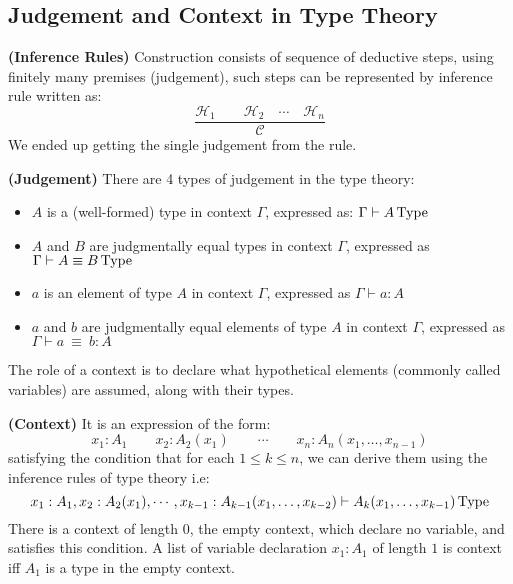 \subsection{Judgement and Context in Type Theory}

\begin{definition}{\textbf{(Inference Rules)}}
    Construction consists of sequence of deductive steps, using finitely many premises (judgement), such steps can be represented by inference rule written as:
    \begin{equation*}
        \frac{\mathcal{H}_1\qquad\mathcal{H}_2\quad\cdots\quad\mathcal{H}_n}{\mathcal{C}}
    \end{equation*}
    We ended up getting the single judgement from the rule.
\end{definition}

\begin{definition}{\textbf{(Judgement)}}
    There are 4 types of judgement in the type theory:
    \begin{itemize}
        \item $A$ is a (well-formed) type in context $\Gamma$, expressed as: $\Gamma\vdash A \operatorname{Type} $
        \item $A$ and $B$ are judgmentally equal types in context $\Gamma$, expressed as $\Gamma\vdash A\equiv B\operatorname{Type} $
        \item $a$ is an element of type $A$ in context $\Gamma$, expressed as $\Gamma\vdash a:A$
        \item $a$ and $b$ are judgmentally equal elements of type $A$ in context $\Gamma$, expressed as $\Gamma\vdash a \ \equiv \ b:A$
    \end{itemize}

\end{definition}

The role of a context is to declare what hypothetical elements (commonly called variables) are assumed, along with their types.

\begin{definition}{\textbf{(Context)}}
    It is an expression of the form:
    \begin{equation*}
        x_1:A_1 \qquad x_2:A_2(x_1) \qquad \cdots \qquad x_n:A_n(x_1,\dots,x_{n-1})
    \end{equation*}
    satisfying the condition that for each $1\le k\le n$, we can derive them using the inference rules of type theory i.e:
    \begin{equation*}
        x_1:A_1, x_2:A_2(x_1) , \cdots, x_{k-1}:A_{k-1}(x_1, \dots, x_{k-2})\vdash A_k(x_1,\dots,x_{k-1}) \operatorname{Type} 
    \end{equation*}
    There is a context of length $0$, the empty context, which declare no variable, and satisfies this condition. A list of variable declaration $x_1:A_1$ of length $1$ is context iff $A_1$ is a type in the empty context.
\end{definition}


